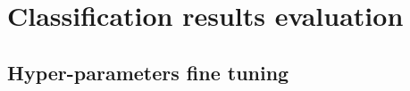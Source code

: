 \chapter{Classification results evaluation} \label{chapt4}
\section{Hyper-parameters fine tuning} \label{sect4_1}